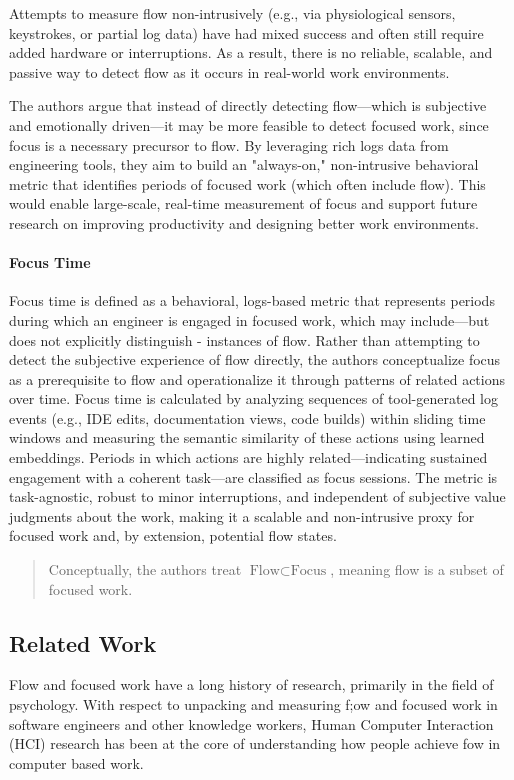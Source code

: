 Attempts to measure flow non-intrusively (e.g., via physiological sensors, keystrokes, or partial log data) have had mixed success and often still require added hardware or interruptions. As a result, there is no reliable, scalable, and passive way to detect flow as it occurs in real-world work environments.

The authors argue that instead of directly detecting flow—which is subjective and emotionally driven—it may be more feasible to detect focused work, since focus is a necessary precursor to flow. By leveraging rich logs data from engineering tools, they aim to build an "always-on," non-intrusive behavioral metric that identifies periods of focused work (which often include flow). This would enable large-scale, real-time measurement of focus and support future research on improving productivity and designing better work environments.

\paragraph{Focus Time}
\label{2:19:sec_focus_time}
Focus time is defined as a behavioral, logs-based metric that represents periods during which an engineer is engaged in focused work, which may include—but does not explicitly distinguish - instances of flow. Rather than attempting to detect the subjective experience of flow directly, the authors conceptualize focus as a prerequisite to flow and operationalize it through patterns of related actions over time. Focus time is calculated by analyzing sequences of tool-generated log events (e.g., IDE edits, documentation views, code builds) within sliding time windows and measuring the semantic similarity of these actions using learned embeddings. Periods in which actions are highly related—indicating sustained engagement with a coherent task—are classified as focus sessions. The metric is task-agnostic, robust to minor interruptions, and independent of subjective value judgments about the work, making it a scalable and non-intrusive proxy for focused work and, by extension, potential flow states.
\begin{quote}
    Conceptually, the authors treat $\text{Flow} \subset \text{Focus}$, meaning flow is a subset of focused work.
\end{quote}
\subsection{Related Work}
Flow and focused work have a long history of research, primarily in the field of psychology. With respect to unpacking and measuring f;ow and focused work in software engineers and other knowledge workers, Human Computer Interaction (HCI) research has been at the core of understanding how people achieve fow in computer based work.

